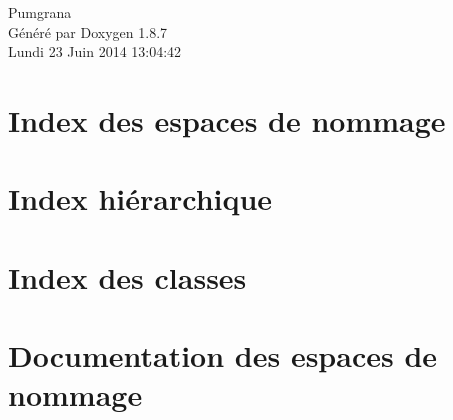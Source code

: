 \documentclass[twoside]{book}
\newcommand{\+}{\discretionary{\mbox{\scriptsize$\hookleftarrow$}}{}{}}
\newcommand{\clearemptydoublepage}{%
  \newpage{\pagestyle{empty}\cleardoublepage}%
}
\begin{document}
\hypersetup{pageanchor=false,
             bookmarks=true,
             bookmarksnumbered=true,
             pdfencoding=unicode
            }
\begin{titlepage}
\vspace*{7cm}
\begin{center}%
{\Large Pumgrana }\\
\vspace*{1cm}
{\large Généré par Doxygen 1.8.7}\\
\vspace*{0.5cm}
{\small Lundi 23 Juin 2014 13:04:42}\\
\end{center}
\end{titlepage}
\clearemptydoublepage
\tableofcontents
\clearemptydoublepage
{}
\hypersetup{pageanchor=true}

\chapter{Index des espaces de nommage}

\chapter{Index hiérarchique}

\chapter{Index des classes}

\chapter{Documentation des espaces de nommage}


\end{document}

